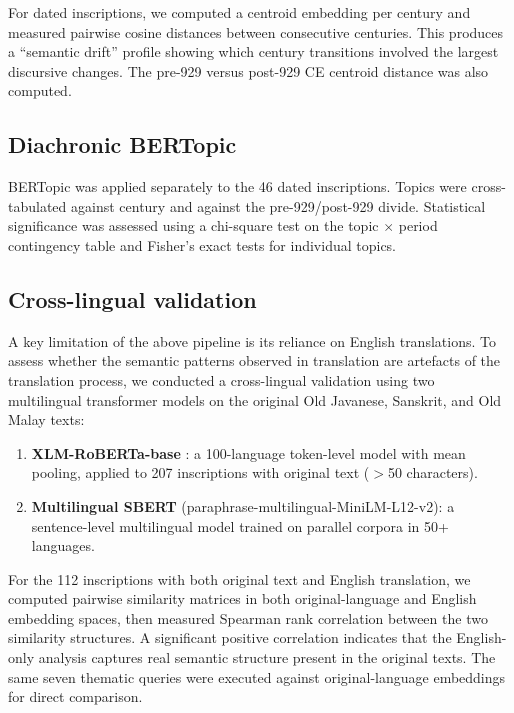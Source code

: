 \documentclass[12pt]{article}
\begin{document}
For dated inscriptions, we computed a centroid embedding per century and measured pairwise cosine distances between consecutive centuries.
This produces a ``semantic drift'' profile showing which century transitions involved the largest discursive changes.
The pre-929 versus post-929 CE centroid distance was also computed.

\subsection{Diachronic BERTopic}

BERTopic was applied separately to the 46 dated inscriptions.
Topics were cross-tabulated against century and against the pre-929/post-929 divide.
Statistical significance was assessed using a chi-square test on the topic $\times$ period contingency table and Fisher's exact tests for individual topics.

\subsection{Cross-lingual validation}

A key limitation of the above pipeline is its reliance on English translations.
To assess whether the semantic patterns observed in translation are artefacts of the translation process, we conducted a cross-lingual validation using two multilingual transformer models on the original Old Javanese, Sanskrit, and Old Malay texts:

\begin{enumerate}
    \item \textbf{XLM-RoBERTa-base} \citep{Conneau2020}: a 100-language token-level model with mean pooling, applied to 207 inscriptions with original text ($>$50 characters).
    \item \textbf{Multilingual SBERT} (paraphrase-multilingual-MiniLM-L12-v2): a sentence-level multilingual model trained on parallel corpora in 50+ languages.
\end{enumerate}

For the 112 inscriptions with both original text and English translation, we computed pairwise similarity matrices in both original-language and English embedding spaces, then measured Spearman rank correlation between the two similarity structures.
A significant positive correlation indicates that the English-only analysis captures real semantic structure present in the original texts.
The same seven thematic queries were executed against original-language embeddings for direct comparison.
\end{document}
